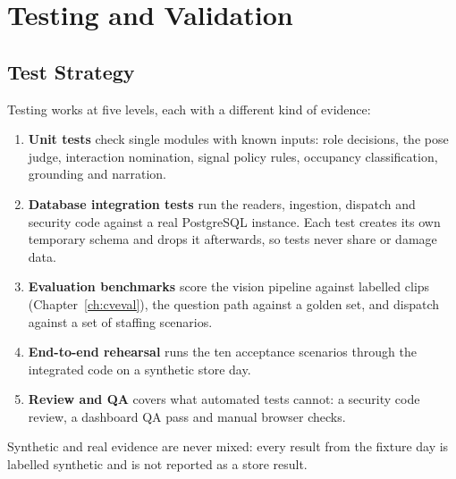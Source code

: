 \chapter{Testing and Validation}
\label{ch:testing}

\section{Test Strategy}
Testing works at five levels, each with a different kind of evidence:
\begin{enumerate}
\item \textbf{Unit tests} check single modules with known inputs: role decisions, the pose judge, interaction nomination, signal policy rules, occupancy classification, grounding and narration.
\item \textbf{Database integration tests} run the readers, ingestion, dispatch and security code against a real PostgreSQL instance. Each test creates its own temporary schema and drops it afterwards, so tests never share or damage data.
\item \textbf{Evaluation benchmarks} score the vision pipeline against labelled clips (Chapter~\ref{ch:cveval}), the question path against a golden set, and dispatch against a set of staffing scenarios.
\item \textbf{End-to-end rehearsal} runs the ten acceptance scenarios through the integrated code on a synthetic store day.
\item \textbf{Review and QA} covers what automated tests cannot: a security code review, a dashboard QA pass and manual browser checks.
\end{enumerate}
Synthetic and real evidence are never mixed: every result from the fixture day is labelled synthetic and is not reported as a store result.

